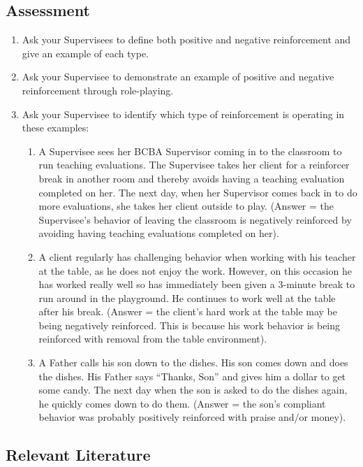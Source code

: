 \subsection{Assessment}
\begin{enumerate}
\item Ask your Supervisees to define both positive and negative reinforcement and give an example of each type.
\item Ask your Supervisee to demonstrate an example of positive and negative reinforcement through role-playing.
\item Ask your Supervisee to identify which type of reinforcement is operating in these examples:
\begin{enumerate}
\item A Supervisee sees her BCBA Supervisor coming in to the classroom to run teaching evaluations. The Supervisee takes her client for a reinforcer break in another room and thereby avoids having a teaching evaluation completed on her. The next day, when her Supervisor comes back in to do more evaluations, she takes her client outside to play. (Answer = the Supervisee's behavior of leaving the classroom is negatively reinforced by avoiding having teaching evaluations completed on her).
\item A client regularly has challenging behavior when working with his teacher at the table, as he does not enjoy the work. However, on this occasion he has worked really well so has immediately been given a 3-minute break to run around in the playground. He continues to work well at the table after his break. (Answer = the client's hard work at the table may be being negatively reinforced. This is because his work behavior is being reinforced with removal from the table environment). 
\item A Father calls his son down to the dishes. His son comes down and does the dishes. His Father says ``Thanks, Son'' and gives him a dollar to get some candy. The next day when the son is asked to do the dishes again, he quickly comes down to do them. (Answer = the son's compliant behavior was probably positively reinforced with praise and/or money).
\end{enumerate}
\end{enumerate}
%
\subsection{Relevant Literature}
\begin{refsection}
\nocite{hall1968effects,
    hart1968effect,
    michael1975positive,
    osborne1969free,
    skinner1938behavior,
    thomas1968production}
\printbibliography[heading=none]
\end{refsection}
%
